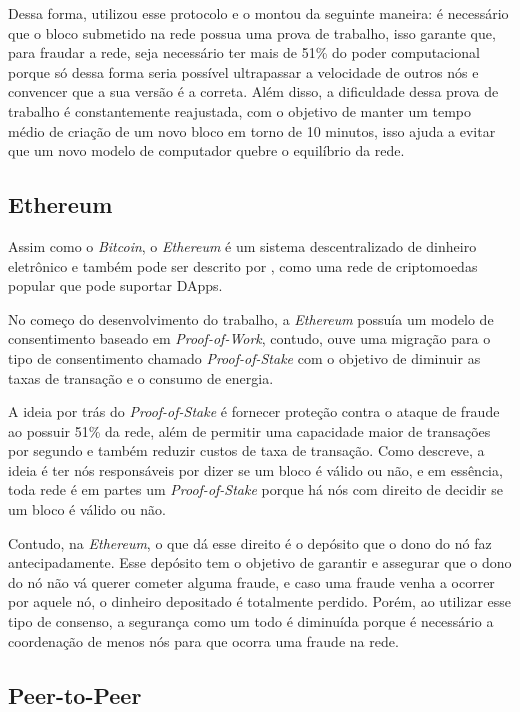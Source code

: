 Dessa forma, \citeauthor{bitcoin} utilizou esse protocolo e o montou da seguinte maneira: é necessário que o bloco submetido na rede possua uma prova de trabalho, isso garante que, para fraudar a rede, seja necessário ter mais de 51\% do poder computacional porque só dessa forma seria possível ultrapassar a velocidade de outros nós e convencer que a sua versão é a correta. Além disso, a dificuldade dessa prova de trabalho é constantemente reajustada, com o objetivo de manter um tempo médio de criação de um novo bloco em torno de 10 minutos, isso ajuda a evitar que um novo modelo de computador quebre o equilíbrio da rede.

\subsection{Ethereum}

Assim como o \textit{Bitcoin}, o \textit{Ethereum} é um sistema descentralizado de dinheiro eletrônico e também pode ser descrito por \cite{ethereum2}, como uma rede de criptomoedas popular que pode suportar DApps.

No começo do desenvolvimento do trabalho, a \textit{Ethereum} possuía um modelo de consentimento baseado em \textit{Proof-of-Work}, contudo, ouve uma migração para o tipo de consentimento chamado \textit{Proof-of-Stake} com o objetivo de diminuir as taxas de transação e o consumo de energia.

A ideia por trás do \textit{Proof-of-Stake} é fornecer proteção contra o ataque de fraude ao possuir 51\% da rede, além de permitir uma capacidade maior de transações por segundo e também reduzir custos de taxa de transação. Como \cite{larimer2013transactions} descreve, a ideia é ter nós responsáveis por dizer se um bloco é válido ou não, e em essência, toda rede é em partes um \textit{Proof-of-Stake} porque há nós com direito de decidir se um bloco é válido ou não. 

Contudo, na \textit{Ethereum}, o que dá esse direito é o depósito que o dono do nó faz antecipadamente. Esse depósito tem o objetivo de garantir e assegurar que o dono do nó não vá querer cometer alguma fraude, e caso uma fraude venha a ocorrer por aquele nó, o dinheiro depositado é totalmente perdido. Porém, ao utilizar esse tipo de consenso, a segurança como um todo é diminuída porque é necessário a coordenação de menos nós para que ocorra uma fraude na rede. 

\subsection{Peer-to-Peer}

